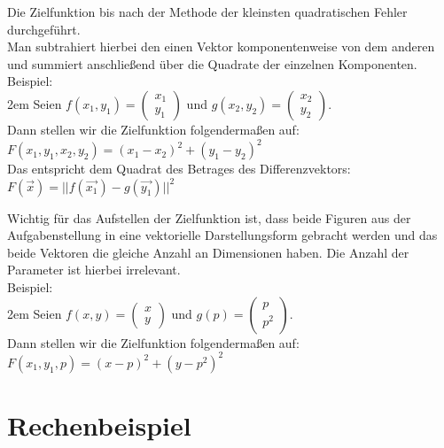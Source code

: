 \documentclass[11pt,final]{scrreprt}
\newcommand{\br} {\medskip\\}
\begin{document}
Die Zielfunktion bis nach der Methode der kleinsten quadratischen Fehler durchgeführt.\\
Man subtrahiert hierbei den einen Vektor komponentenweise von dem anderen und summiert anschließend über die Quadrate der einzelnen Komponenten.\\

Beispiel:\\

\begingroup
\leftskip2em 
Seien $ f(x_1, y_1)=\left(\begin{matrix}
x_1\\
y_1
\end{matrix}\right) $ und $ g(x_2, y_2)=\left(\begin{matrix}
x_2\\
y_2
\end{matrix}\right) $.\br

Dann stellen wir die Zielfunktion folgendermaßen auf:\\
$ F(x_1, y_1, x_2, y_2) = (x_1-x_2)^2+(y_1-y_2)^2 $\\

Das entspricht dem Quadrat des Betrages des Differenzvektors:\\
$ F(\overrightarrow{x}) = ||f(\overrightarrow{x_1})-g(\overrightarrow{y_1})||^2 $\\
\par	
\endgroup

Wichtig für das Aufstellen der Zielfunktion ist, dass beide Figuren aus der Aufgabenstellung in eine vektorielle Darstellungsform gebracht werden und das beide Vektoren die gleiche Anzahl an Dimensionen haben. Die Anzahl der Parameter ist hierbei irrelevant.\\

Beispiel:\\

\begingroup
\leftskip2em 
Seien $ f(x, y)=\left(\begin{matrix}
x\\
y
\end{matrix}\right) $ und $ g(p)=\left(\begin{matrix}
p\\
p^2
\end{matrix}\right) $.\br

Dann stellen wir die Zielfunktion folgendermaßen auf:\\
$ F(x_1, y_1, p) = (x-p)^2+(y-p^2)^2 $
\par	
\endgroup

\newpage
\section{Rechenbeispiel}
\end{document}

